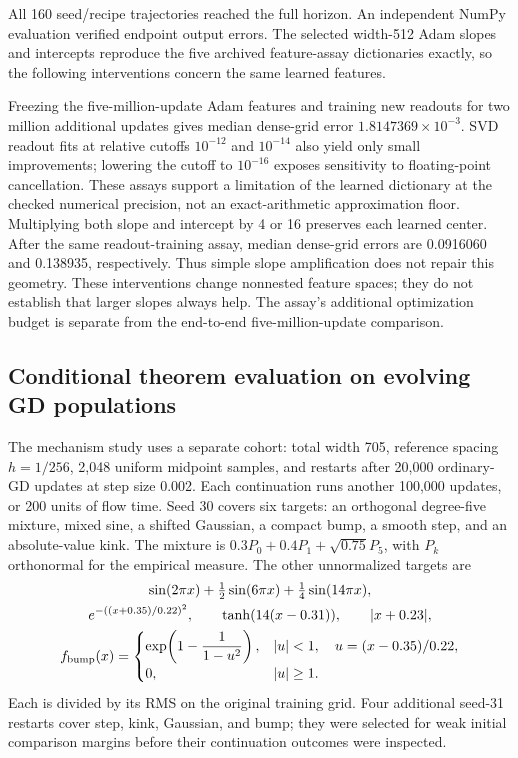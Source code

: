 All 160 seed/recipe trajectories reached the full horizon.
An independent NumPy evaluation verified endpoint output errors.
The selected width-512 Adam slopes and
intercepts reproduce the five archived feature-assay dictionaries exactly,
so the following interventions concern the same learned features.

Freezing the five-million-update Adam features and training new readouts
for two million additional updates gives median dense-grid error
$1.8147369\times10^{-3}$. SVD readout fits at relative cutoffs
$10^{-12}$ and $10^{-14}$ also yield only small improvements; lowering the
cutoff to $10^{-16}$ exposes sensitivity to floating-point cancellation.
These assays support a limitation of the learned dictionary at the checked
numerical precision, not an exact-arithmetic approximation floor.
Multiplying both slope and intercept by 4 or 16 preserves each learned
center. After the same readout-training assay, median dense-grid errors
are 0.0916060 and 0.138935, respectively. Thus simple slope amplification
does not repair this geometry. These interventions change nonnested feature
spaces; they do not establish that larger slopes always help.
The assay's additional optimization budget
is separate from the end-to-end five-million-update comparison.

\subsection{Conditional theorem evaluation on evolving GD populations}
The mechanism study uses a separate cohort: total width 705, reference
spacing $h=1/256$, 2,048 uniform midpoint samples, and restarts after
20,000 ordinary-GD updates at step size 0.002. Each continuation runs
another 100,000 updates, or 200 units of flow time.
Seed 30 covers six targets: an orthogonal degree-five mixture, mixed sine,
a shifted Gaussian, a compact bump, a smooth step, and an absolute-value kink.
The mixture is $0.3P_0+0.4P_1+\sqrt{0.75}P_5$, with $P_k$ orthonormal
for the empirical measure. The other unnormalized targets are
\[
 \begin{gathered}
 \sin(2\pi x)+\tfrac12\sin(6\pi x)+\tfrac14\sin(14\pi x),\\
 e^{-((x+0.35)/0.22)^2},\qquad \tanh(14(x-0.31)),\qquad |x+0.23|,\\
 f_{\rm bump}(x)=
 \begin{cases}
 \exp\!\left(1-\dfrac1{1-u^2}\right),& |u|<1,\quad u=(x-0.35)/0.22,\\
 0,&|u|\ge1.
 \end{cases}
 \end{gathered}
\]
Each is divided by its RMS on the original training grid.
Four additional seed-31 restarts cover step, kink, Gaussian, and bump;
they were selected for weak initial comparison margins before their
continuation outcomes were inspected.

